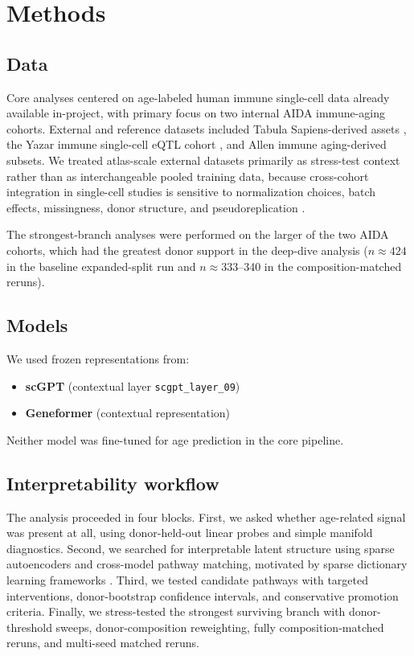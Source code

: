 \documentclass[11pt]{article}
\begin{document}
\section{Methods}
\subsection{Data}
Core analyses centered on age-labeled human immune single-cell data already available in-project, with primary focus on two internal AIDA immune-aging cohorts. External and reference datasets included Tabula Sapiens-derived assets \citep{tabula2022}, the Yazar immune single-cell eQTL cohort \citep{yazar2022}, and Allen immune aging-derived subsets. We treated atlas-scale external datasets primarily as stress-test context rather than as interchangeable pooled training data, because cross-cohort integration in single-cell studies is sensitive to normalization choices, batch effects, missingness, donor structure, and pseudoreplication \citep{luecken2019bestpractices,wolf2018scanpy,hafemeister2019sctransform,stuart2019integration,haghverdi2018mnn,korsunsky2019harmony,tran2020batch,hicks2018missing,zimmerman2021pseudoreplication,squair2021false}.

The strongest-branch analyses were performed on the larger of the two AIDA cohorts, which had the greatest donor support in the deep-dive analysis (\(n\approx 424\) in the baseline expanded-split run and \(n\approx 333\)--340 in the composition-matched reruns).

\subsection{Models}
We used frozen representations from:
\begin{itemize}
  \item \textbf{scGPT} (contextual layer \texttt{scgpt\_layer\_09}) \citep{cui2024scgpt}
  \item \textbf{Geneformer} (contextual representation) \citep{theodoris2023geneformer}
\end{itemize}

Neither model was fine-tuned for age prediction in the core pipeline.

\subsection{Interpretability workflow}
The analysis proceeded in four blocks. First, we asked whether age-related signal was present at all, using donor-held-out linear probes and simple manifold diagnostics. Second, we searched for interpretable latent structure using sparse autoencoders and cross-model pathway matching, motivated by sparse dictionary learning frameworks \citep{bricken2023monosemanticity,templeton2024scaling}. Third, we tested candidate pathways with targeted interventions, donor-bootstrap confidence intervals, and conservative promotion criteria. Finally, we stress-tested the strongest surviving branch with donor-threshold sweeps, donor-composition reweighting, fully composition-matched reruns, and multi-seed matched reruns.
\end{document}
